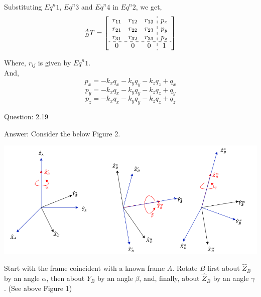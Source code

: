\documentclass[a4paper]{article}
\begin{document}
\begin{qalist}
			Substituting ${Eq}^{n} 1$, ${Eq}^{n} 3$ and ${Eq}^{n} 4$ in ${Eq}^{n} 2$, we get, 
			\begin{equation}
				{}^{A}_{B}{T} = 
				\left[\begin{array}{ccc:c}
					{r}_{11} & {r}_{12} & {r}_{13} & {p}_{x}\\
					{r}_{21} & {r}_{22} & {r}_{23} & {p}_{y}\\
					{r}_{31} & {r}_{32} & {r}_{33} & {p}_{z}\\
					\hdashline
					0 & 0 & 0 & 1\\
				\end{array}\right]
			\end{equation}
			
			Where, ${r}_{ij}$ is given by ${Eq}^{n} 1$.
			\\And,
			\begin{equation}
				{p}_{x} = - {k}_{x} {q}_{x} - {k}_{y}{q}_{y} - {k}_{z}{q}_{z} + {q}_{x}
			\end{equation}
			\begin{equation}
				{p}_{y} = - {k}_{x} {q}_{x} - {k}_{y}{q}_{y} - {k}_{z}{q}_{z} + {q}_{y}
			\end{equation}
			\begin{equation}
				{p}_{z} = - {k}_{x} {q}_{x} - {k}_{y}{q}_{y} - {k}_{z}{q}_{z} + {q}_{z}
			\end{equation}
			
		\item[Question: 2.19] \setcounter{equation}{0} 
		\item[Answer:]
		Consider the below Figure 2.	\\				
			\begin{minipage}{\linewidth}
				\centering
				\includegraphics[width=1\textwidth]{zyzEulerAngles.drawio.png}
			\end{minipage}
			Start with the frame coincident with a known frame $A$. Rotate $B$ first about $\hat{Z}_{B}$ by an angle $\alpha$, then about $\hat{Y}_{B}$ by an angle $\beta$, and, finally, about $\hat{Z}_{B}$ by an angle $\gamma$ . (See above Figure 1) \\
			

\end{qalist}
\end{document}
